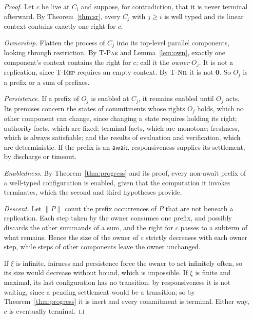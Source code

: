 \documentclass[11pt,openany]{book}
\theoremstyle{remark}
\begin{document}
\begin{proof}
Let $c$ be live at $C_i$ and suppose, for contradiction, that it is never
terminal afterward. By Theorem~\ref{thm:sr}, every $C_j$ with $j\ge i$ is
well typed and its linear context contains exactly one right for $c$.

\emph{Ownership.} Flatten the process of $C_j$ into its top-level
parallel components, looking through restriction. By \textsc{T-Par} and
Lemma~\ref{lem:own}, exactly one component's context contains the right
for $c$; call it the \emph{owner} $O_j$. It is not a replication, since
\textsc{T-Rep} requires an empty context. By \textsc{T-Nil} it is not
$\mathbf 0$. So $O_j$ is a prefix or a sum of prefixes.

\emph{Persistence.} If a prefix of $O_j$ is enabled at $C_j$, it remains
enabled until $O_j$ acts. Its premises concern the states of commitments
whose rights $O_j$ holds, which no other component can change, since
changing a state requires holding its right; authority facts, which are
fixed; terminal facts, which are monotone; freshness, which is always
satisfiable; and the results of evaluation and verification, which are
deterministic. If the prefix is an $\mathsf{await}$, responsiveness
supplies its settlement, by discharge or timeout.

\emph{Enabledness.} By Theorem~\ref{thm:progress} and its proof, every
non-await prefix of a well-typed configuration is enabled, given that the
computation it invokes terminates, which the second and third hypotheses
provide.

\emph{Descent.} Let $\|P\|$ count the prefix occurrences of $P$ that are
not beneath a replication. Each step taken by the owner consumes one
prefix, and possibly discards the other summands of a sum, and the right
for $c$ passes to a subterm of what remains. Hence the size of the owner
of $c$ strictly decreases with each owner step, while steps of other
components leave the owner unchanged.

If $\xi$ is infinite, fairness and persistence force the owner to act
infinitely often, so its size would decrease without bound, which is
impossible. If $\xi$ is finite and maximal, its last configuration has no
transition; by responsiveness it is not waiting, since a pending
settlement would be a transition; so by Theorem~\ref{thm:progress} it is
inert and every commitment is terminal. Either way, $c$ is eventually
terminal.
\end{proof}
\end{document}
